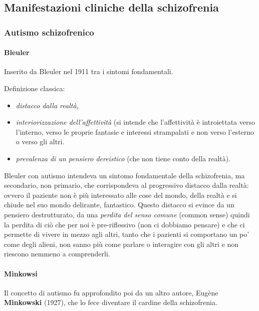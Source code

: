\subsection{Manifestazioni cliniche della schizofrenia}

\subsubsection{Autismo schizofrenico}

\paragraph{Bleuler}

Inserito da Bleuler nel 1911 tra i sintomi fondamentali.

Definizione classica:

\begin{itemize}
\item
  \emph{distacco dalla realtà,}
\item
  \emph{interiorizzazione dell'affettività} (si intende che
  l'affettività è introiettata verso l'interno, verso le proprie
  fantasie e interessi strampalati e non verso l'esterno o verso gli
  altri.
\item
  \emph{prevalenza di un pensiero dereistico} (che non tiene conto della
  realtà).
\end{itemize}

Bleuler con autismo intendeva un sintomo fondamentale della
schizofrenia, ma secondario, non primario, che corrispondeva al
progressivo distacco dalla realtà: ovvero il paziente non è più
interessato alle cose del mondo, della realtà e si chiude nel suo mondo
delirante, fantastico. Questo distacco si evince da un pensiero
destrutturato, da una \emph{perdita del senso comune} (common sense)
quindi la perdita di ciò che per noi è pre-riflessivo (non ci dobbiamo
pensare) e che ci permette di vivere in mezzo agli altri, tanto che i
pazienti si comportano un po' come degli alieni, non sanno più come
parlare o interagire con gli altri e non riescono nemmeno a
comprenderli.

\paragraph{Minkowsi}

Il concetto di autismo fu approfondito poi da un altro autore, Eugène
\textbf{Minkowski} (1927), che lo fece diventare il cardine della
schizofrenia.

